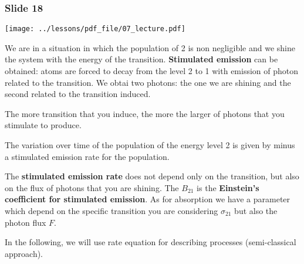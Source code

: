 \documentclass[../main/main.tex]{subfiles}
\begin{document}
\subsubsection*{Slide 18}

\begin{minipage}[]{0.5\linewidth}
\centering
\texttt{[image: ../lessons/pdf\_file/07\_lecture.pdf]}
\end{minipage}
\hspace{0.3cm}\vspace{0.3cm}
\begin{minipage}[c]{0.47\linewidth}

We are in a situation in which the population of 2 is non negligible and we shine the system with the energy of the transition.  \textbf{Stimulated emission} can be obtained: atoms are forced to decay from the level 2 to 1 with emission of photon related to the transition. We obtai two photons: the one we are shining and the second related to the transition induced.

The more transition that you induce, the more the larger of photons that you stimulate to produce.

The variation over time of the population of the energy level 2 is given by minus a stimulated emission rate for the population.

\end{minipage}

The \textbf{stimulated emission rate} does not depend only on the transition, but also on the flux of photons that you are shining.
The \( B_{21} \) is the \textbf{Einstein's coefficient for stimulated emission}. As for absorption we have a parameter which depend on the specific transition you are considering \( \sigma
_{21} \) but also the photon flux \( F \).

In the following, we will use rate equation for describing processes (semi-classical approach).
\end{document}

